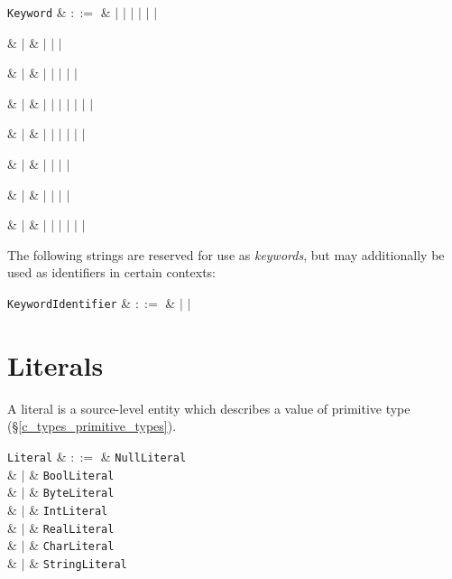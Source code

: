 \begin{syntax}
\verb+Keyword+ & $::=$ &  $|$  $|$
 $|$  $|$  $|$ 
$|$ \\

{\huge\strut} & $|$ &  $|$  $|$  $|$ \\
{\huge\strut} & $|$ &  $|$  $|$  $|$  $|$  $|$ \\
{\huge\strut} & $|$ &  $|$  $|$  $|$  $|$  $|$  $|$  $|$  \\
{\huge\strut} & $|$ &  $|$  $|$  $|$  $|$  $|$  $|$ \\
{\huge\strut} & $|$ &   $|$  $|$  $|$  $|$ \\
{\huge\strut} & $|$ &  $|$  $|$  $|$  $|$ \\
{\huge\strut} & $|$ &  $|$  $|$  $|$  $|$  $|$  $|$ \\
\end{syntax}

The following strings are reserved for use as {\em keywords}, but may additionally be used as identifiers in certain contexts:
\begin{syntax}
\verb+KeywordIdentifier+ & $::=$ &  $|$  $|$ \\
\end{syntax}



\section{Literals}

A \gls{literal} is a source-level entity which describes a value of primitive type (\S\ref{c_types_primitive_types}).

\begin{syntax}
\verb+Literal+ & $::=$ &  \verb+NullLiteral+ \\
  & $|$ & \verb+BoolLiteral+ \\
  & $|$ & \verb+ByteLiteral+ \\
  & $|$ & \verb+IntLiteral+ \\
  & $|$ & \verb+RealLiteral+ \\
  & $|$ & \verb+CharLiteral+ \\
  & $|$ & \verb+StringLiteral+ \\
\\
\end{syntax}

